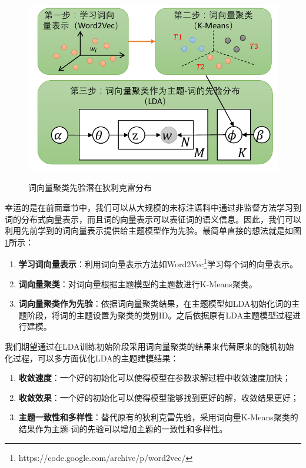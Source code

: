 \documentclass[master]{njuthesis}
\begin{document}
\begin{figure}[htbp]
  \centering
  \includegraphics[width= 1.0\textwidth]{figures//word_cluster_prior_chap5.pdf}\\
  \caption{词向量聚类先验潜在狄利克雷分布}\label{fig:wc_prior_chap5}
\end{figure}

幸运的是在前面章节中，我们可以从大规模的未标注语料中通过非监督方法学习到词的分布式向量表示，而且词的向量表示可以表征词的语义信息。因此，我们可以利用先前学到的词向量表示提供给主题模型作为先验。最简单直接的想法就是如图\ref{fig:wc_prior_chap5}所示：

	\begin{enumerate}
	\item \textbf{学习词向量表示}：利用词向量表示方法如Word2Vec\footnote{https://code.google.com/archive/p/word2vec/}学习每个词的向量表示。
	\item \textbf{词向量聚类}：对词向量根据主题模型的主题数进行K-Means聚类。
	\item \textbf{词向量聚类作为先验}：依据词向量聚类结果，在主题模型如LDA初始化词的主题阶段，将词的主题设置为聚类的类别ID。之后依据原有LDA主题模型过程进行建模。
	\end{enumerate}
	
我们期望通过在LDA训练初始阶段采用词向量聚类的结果来代替原来的随机初始化过程，可以多方面优化LDA的主题建模结果：
	\begin{enumerate}
	\item \textbf{收敛速度}：一个好的初始化可以使得模型在参数求解过程中收敛速度加快；
	\item \textbf{收敛效果}：一个好的初始化可以使得模型能够找到更好的解，收敛结果更好；
	\item \textbf{主题一致性和多样性}：替代原有的狄利克雷先验，采用词向量K-Means聚类的结果作为主题-词的先验可以增加主题的一致性和多样性。
	\end{enumerate}
\end{document}
